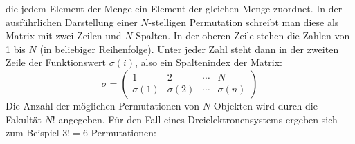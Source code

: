 \documentclass[9pt]{report}
\begin{document}
die jedem Element der Menge ein Element der gleichen Menge zuordnet. In der ausführlichen Darstellung einer $N$-stelligen Permutation schreibt man diese als Matrix mit zwei Zeilen und $N$ Spalten. In der oberen Zeile stehen die Zahlen von 1 bis $N$ (in beliebiger Reihenfolge). Unter jeder Zahl steht dann in der zweiten Zeile der Funktionswert $\sigma(i)$, also ein Spaltenindex der Matrix:
\begin{equation}
\sigma=\left(\begin{array}{cccc}
1  &  2  &  \cdots  &  N  \\
\sigma(1)  &  \sigma(2)  &  \cdots  & \sigma(n)
\end{array}\right)
\end{equation}
Die Anzahl der möglichen Permutationen von $N$ Objekten wird durch die Fakultät $N!$ angegeben. Für den Fall eines Dreielektronensystems ergeben sich zum Beispiel $3!=6$ Permutationen:
\end{document}
